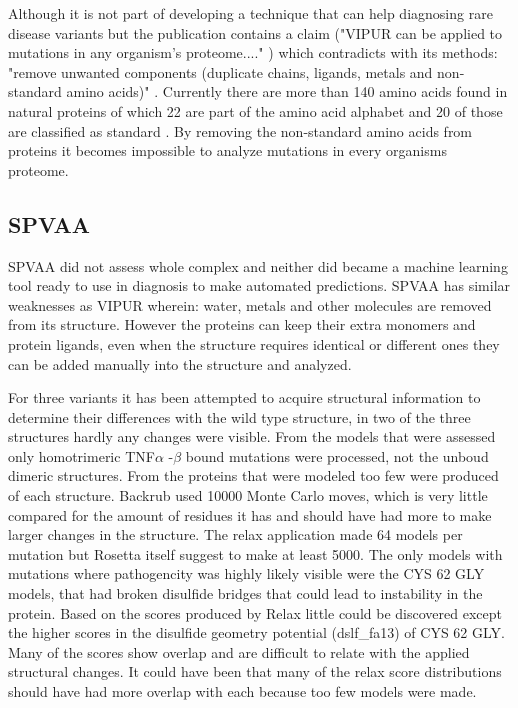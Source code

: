 Although it is not part of developing a technique that can help diagnosing rare disease variants but the publication contains a claim ("VIPUR can be applied to mutations in any organism’s proteome...." \cite{baugh_robust_2016}) which contradicts with its methods: "remove unwanted components (duplicate chains, ligands, metals and non-standard amino acids)" \cite{baugh_robust_2016}. Currently there are more than 140 amino acids found in natural proteins of which 22 are part of the amino acid alphabet and 20 of those are classified as standard \cite{ambrogelly_natural_2007}. By removing the non-standard amino acids from proteins it becomes impossible to analyze mutations in every organisms proteome.

\subsection{SPVAA}
SPVAA did not assess whole complex and neither did became a machine learning tool ready to use in diagnosis to make automated predictions. SPVAA has similar weaknesses as VIPUR wherein: water, metals and other molecules are removed from its structure. However the proteins can keep their extra monomers and protein ligands, even when the structure requires identical or different ones they can be added manually into the structure and analyzed. 

For three variants it has been attempted to acquire structural information to determine their differences with the wild type structure, in two of the three structures hardly any changes were visible. From the models that were assessed only homotrimeric TNF$\alpha$ -$\beta$ bound mutations were processed, not the unboud dimeric structures. From the proteins that were modeled too few were produced of each structure. Backrub used 10000 Monte Carlo moves, which is very little compared for the amount of residues it has and should have had more to make larger changes in the structure. The relax application made 64 models per mutation but Rosetta itself suggest to make at least 5000\cite{rosetta_commons_analyzing_nodate}.
The only models with mutations where pathogencity was highly likely visible were the CYS 62 GLY models, that had broken disulfide bridges that could lead to instability in the protein. Based on the scores produced by Relax little could be discovered except the higher scores in the disulfide geometry potential (dslf\_fa13) of CYS 62 GLY. Many of the scores show overlap and are difficult to relate with the applied structural changes. It could have been that many of the relax score distributions should have had more overlap with each because too few models were made.

